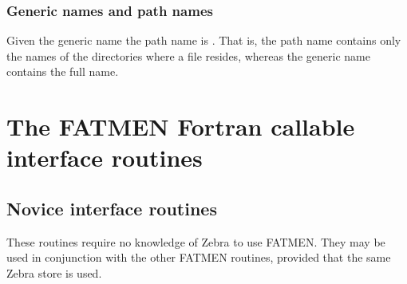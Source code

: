 \subsection{Generic names and path names}
\par
Given the generic name 
the path name is 
.
That is, the path name contains only the names of the directories
where a file resides, whereas the generic name contains the full
name.
\chapter{The FATMEN Fortran callable interface routines}
\section{Novice interface routines}
\par
These routines require no knowledge of Zebra to use FATMEN.
They may be used in conjunction with the other FATMEN
routines, provided that the same Zebra store is used.
